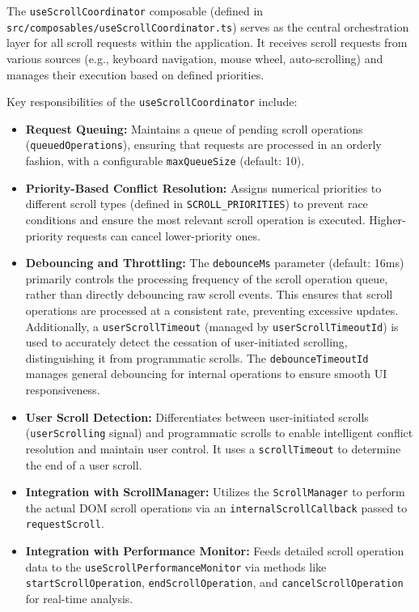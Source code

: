 \documentclass[10pt]{article}
\begin{document}
The \texttt{useScrollCoordinator} composable (defined in \texttt{src/composables/useScrollCoordinator.ts}) serves as the central orchestration layer for all scroll requests within the application. It receives scroll requests from various sources (e.g., keyboard navigation, mouse wheel, auto-scrolling) and manages their execution based on defined priorities.

Key responsibilities of the \texttt{useScrollCoordinator} include:
\begin{itemize}
    \item \textbf{Request Queuing:} Maintains a queue of pending scroll operations (\texttt{queuedOperations}), ensuring that requests are processed in an orderly fashion, with a configurable \texttt{maxQueueSize} (default: 10).
    \item \textbf{Priority-Based Conflict Resolution:} Assigns numerical priorities to different scroll types (defined in \texttt{SCROLL\_PRIORITIES}) to prevent race conditions and ensure the most relevant scroll operation is executed. Higher-priority requests can cancel lower-priority ones.
    \item \textbf{Debouncing and Throttling:} The \texttt{debounceMs} parameter (default: 16ms) primarily controls the processing frequency of the scroll operation queue, rather than directly debouncing raw scroll events. This ensures that scroll operations are processed at a consistent rate, preventing excessive updates. Additionally, a \texttt{userScrollTimeout} (managed by \texttt{userScrollTimeoutId}) is used to accurately detect the cessation of user-initiated scrolling, distinguishing it from programmatic scrolls. The \texttt{debounceTimeoutId} manages general debouncing for internal operations to ensure smooth UI responsiveness.
    \item \textbf{User Scroll Detection:} Differentiates between user-initiated scrolls (\texttt{userScrolling} signal) and programmatic scrolls to enable intelligent conflict resolution and maintain user control. It uses a \texttt{scrollTimeout} to determine the end of a user scroll.
    \item \textbf{Integration with ScrollManager:} Utilizes the \texttt{ScrollManager} to perform the actual DOM scroll operations via an \texttt{internalScrollCallback} passed to \texttt{requestScroll}.
    \item \textbf{Integration with Performance Monitor:} Feeds detailed scroll operation data to the \texttt{useScrollPerformanceMonitor} via methods like \texttt{startScrollOperation}, \texttt{endScrollOperation}, and \texttt{cancelScrollOperation} for real-time analysis.

\end{itemize}
\end{document}
